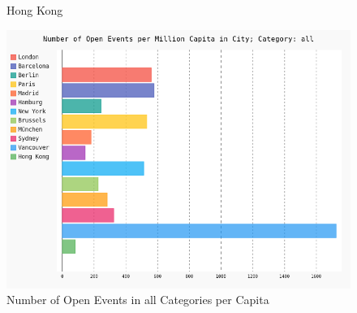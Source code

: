 \begin{figure}[!htp]
	\hfill
	\caption{Hong Kong}\label{fig:hongkongmap}
\end{figure}


\begin{figure}[!htp]
	\includegraphics[width=1\linewidth]{../plotting/pngs/activities_per_city_per_capita/all.png}
	\caption{Number of Open Events in all Categories per Capita}\label{fig:categories_all_percapita}	
\end{figure}
